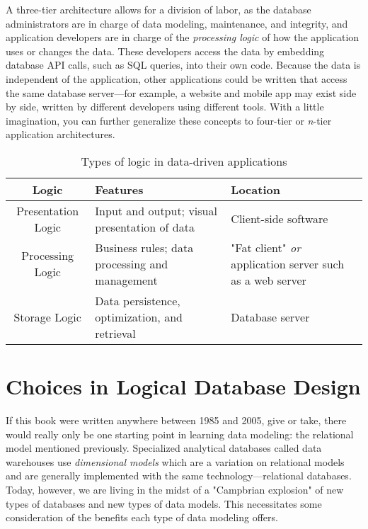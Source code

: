 \documentclass[11pt]{book}
\newcommand{\term}[1]{\emph{#1}} %
\newcommand{\head}[1]{\textnormal{\textbf{#1}}} %
\begin{document}
A three-tier architecture allows for a division of labor, as the database administrators are in charge of data modeling, maintenance, and integrity, and application developers are in charge of the \term{processing logic} of how the application uses or changes the data.  These developers access the data by embedding database API calls, such as SQL queries, into their own code.  Because the data is independent of the application, other applications could be written that access the same database server---for example, a website and mobile app may exist side by side, written by different developers using different tools.  With a little imagination, you can further generalize these concepts to four-tier or \emph{n}-tier application architectures.

\begin{table}
\centering
\caption{Types of logic in data-driven applications}\label{tab:applogic}
\vspace{10pt}
\begin{tabular}{cp{4cm}p{4.5cm}}
    \toprule[1.5pt]
    \head{Logic} & \head{Features} & \head{Location}\\
    \midrule
    Presentation Logic & Input and output; visual presentation of data & Client-side software \\
    \midrule
    Processing Logic & Business rules; data processing and management & "Fat client" \emph{or} application server such as a web server\\
    \midrule
    Storage Logic & Data persistence, optimization, and retrieval & Database server \\
    \bottomrule[1.5pt]
\end{tabular}
\end{table}

\section{Choices in Logical Database Design}

If this book were written anywhere between 1985 and 2005, give or take, there would really only be one starting point in learning data modeling: the relational model mentioned previously.  Specialized analytical databases called data warehouses use \term{dimensional models} which are a variation on relational models and are generally implemented with the same technology---relational databases.  Today, however, we are living in the midst of a "Campbrian explosion" of new types of databases and new types of data models.  This necessitates some consideration of the benefits each type of data modeling offers.
\end{document}
